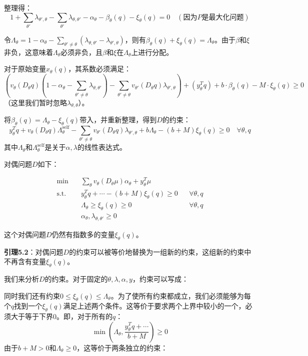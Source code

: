 整理得：
$$1+\sum\limits_{\theta'}\lambda_{\theta',\theta}-\sum\limits_{\theta'}\lambda_{\theta,\theta'}-\alpha_{\theta}-\beta_{\theta}(q) - \xi_{\theta}(q) = 0\quad(\text{因为}P\text{是最大化问题})$$

令$\Lambda_\theta = 1 - \alpha_\theta - \sum\limits_{\theta' \neq\theta}(\lambda_{\theta,\theta'}-\lambda_{\theta',\theta})$，则有$\beta_{\theta}(q) + \xi_{\theta}(q) = \Lambda_\theta$。由于$\beta$和$\xi$非负，这意味着$\Lambda_\theta$必须非负，且$\beta$和$\xi$在$\Lambda_\theta$上进行分配。

对于原始变量$x_\theta(q)$，其系数必须满足：
$$\left(v_\theta(D_\theta q)(1 - \alpha_\theta - \sum\limits_{\theta' \neq\theta}\lambda_{\theta,\theta'}) - \sum\limits_{\theta' \neq \theta}v_{\theta'}(D_{\theta} q)\lambda_{\theta',\theta}\right) + (y_{\theta}^T q) + b\cdot \beta_\theta(q) - M\cdot \xi_{\theta}(q)\geq 0$$
（这里我们暂时忽略$\lambda_{\theta,\theta}$）。

将$\beta_\theta(q) = \Lambda_\theta - \xi_\theta(q)$带入，并重新整理，得到$D$的约束：
$$y_{\theta}^T q + v_\theta(D_\theta q)\Lambda_{\theta}^{\text{self}} - \sum\limits_{\theta'\neq\theta}v_{\theta'}(D_\theta q)\lambda_{\theta',\theta} + b\Lambda_\theta - (b+M)\xi_\theta(q) \geq 0 \quad \forall \theta,q$$
其中$\Lambda_\theta$和$\Lambda_{\theta}^{\text{self}}$是关于$\alpha,\lambda$的线性表达式。

对偶问题$D$如下：

\begin{align*}
    \min \quad & \sum_{\theta} v_{\theta}(D_{\theta}\mu)\alpha_{\theta} + y_{\theta}^{T}\mu \\
    \text{s.t.} \quad & y_{\theta}^{T}q + \cdots - (b+M)\xi_{\theta}(q) \geq 0 && \forall \theta, q \\
    & \Lambda_{\theta} \geq \xi_{\theta}(q) \geq 0 && \forall \theta, q \\
    & \alpha_{\theta}, \lambda_{\theta, \theta'} \geq 0
\end{align*}

这个对偶问题$D$仍然有指数多的变量$\xi_\theta(q)$。

\textbf{引理5.2}：对偶问题$D$的约束可以被等价地替换为一组新的约束，这组新的约束中不再含有变量$\xi_\theta(q)$。

我们来分析$D$的约束。对于固定的$\theta,\lambda,\alpha,y$，约束可以写成：

同时我们还有约束$0\leq \xi_\theta(q)\leq \Lambda_\theta$。为了使所有约束都成立，我们必须能够为每个$q$找到一个$\xi_\theta(q)$满足上述两个条件。这等价于要求两个上界中较小的一个，必须大于等于下界0。即，对于所有的$q$：
$$\min \left(\Lambda_\theta, \frac{y_{\theta}^T q+\cdots}{b+M}\right)\geq 0$$
由于$b+M>0$和$\Lambda_\theta\geq 0$，这等价于两条独立的约束：

